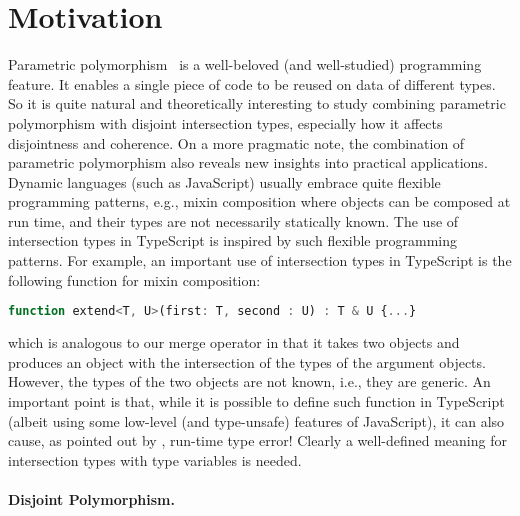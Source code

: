 
\section{Motivation}

Parametric polymorphism~\citep{reynolds1983types} is a well-beloved (and
well-studied) programming feature. It enables a single piece of code to be
reused on data of different types. So it is quite natural and theoretically
interesting to study combining parametric polymorphism with disjoint
intersection types, especially how it affects disjointness and coherence. On a more
pragmatic note, the combination of parametric polymorphism also reveals new
insights into practical applications. Dynamic languages (such as JavaScript)
usually embrace quite flexible programming patterns, e.g., mixin composition
where objects can be composed at run time, and their types are not necessarily
statically known. The use of intersection types in TypeScript is inspired by
such flexible programming patterns. For example, an important use of
intersection types in TypeScript is the following function for mixin
composition:
\begin{lstlisting}[language=JavaScript]
function extend<T, U>(first: T, second : U) : T & U {...}
\end{lstlisting}
which is analogous to our merge operator in that it takes two objects and
produces an object with the intersection of the types of the argument objects.
However, the types of the two objects are not known, i.e., they are generic. An
important point is that, while it is possible to define such function in
TypeScript (albeit using some low-level (and type-unsafe) features of
JavaScript), it can also cause, as pointed out by \citet{alpuimdisjoint},
run-time type error! Clearly a well-defined meaning for intersection types with
type variables is needed.


\paragraph{Disjoint Polymorphism.}

